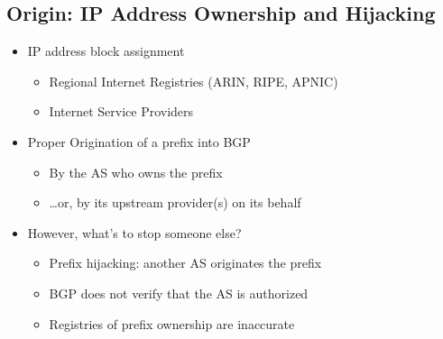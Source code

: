 \subsection{Origin: IP Address Ownership and Hijacking}
\begin{itemize}
    \item IP address block assignment
          \begin{itemize}
              \item Regional Internet Registries (ARIN, RIPE, APNIC)
              \item Internet Service Providers
          \end{itemize}
    \item Proper Origination of a prefix into BGP
          \begin{itemize}
              \item By the AS who owns the prefix
              \item \dots or, by its upstream provider(s) on its behalf
          \end{itemize}
    \item However, what's to stop someone else?
          \begin{itemize}
              \item Prefix hijacking: another AS originates the prefix
              \item BGP does not verify that the AS is authorized
              \item Registries of prefix ownership are inaccurate
          \end{itemize}
\end{itemize}

